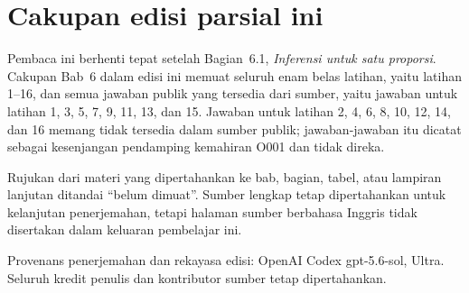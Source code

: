 \documentclass[10pt,openany]%
{book}
\date{}
\begin{document}
%
\renewcommand{\thepage}{}
\maketitle

\renewcommand{\thepage}{\arabic{page}}
\tableofcontents

\normalsize

\chapter*{Cakupan edisi parsial ini}
Pembaca ini berhenti tepat setelah Bagian~6.1,
\emph{Inferensi untuk satu proporsi}. Cakupan Bab~6 dalam edisi ini
memuat seluruh enam belas latihan, yaitu latihan 1--16, dan semua
jawaban publik yang tersedia dari sumber, yaitu jawaban untuk latihan
1, 3, 5, 7, 9, 11, 13, dan 15. Jawaban untuk latihan 2, 4, 6, 8, 10,
12, 14, dan 16 memang tidak tersedia dalam sumber publik;
jawaban-jawaban itu dicatat sebagai kesenjangan pendamping kemahiran
O001 dan tidak direka.

Rujukan dari materi yang dipertahankan ke bab, bagian, tabel, atau lampiran
lanjutan ditandai ``belum dimuat''. Sumber lengkap tetap dipertahankan untuk
kelanjutan penerjemahan, tetapi halaman sumber berbahasa Inggris tidak
disertakan dalam keluaran pembelajar ini.

Provenans penerjemahan dan rekayasa edisi: OpenAI Codex gpt-5.6-sol, Ultra.
Seluruh kredit penulis dan kontributor sumber tetap dipertahankan.

\begingroup
\makeatletter
\def\@currentlabel{belum dimuat}
\label{ch_regr_mult_and_log}
\label{oneSampleMeansWithTDistribution}
\label{ch_regr_simple_linear}
\label{appendix_data}
\label{linRegrForTwoVar}
\label{normalProbabilityTable}
\label{multipleAndLogisticRegression}
\makeatother
\endgroup

\begingroup

%
\setcounter{chapter}{1}
\addtocounter{chapter}{-1}
\normalsize


\setcounter{chapter}{2}
\addtocounter{chapter}{-1}
\normalsize


\setcounter{chapter}{3}
\addtocounter{chapter}{-1}
\normalsize

\setcounter{chapter}{4}
\addtocounter{chapter}{-1}
\normalsize

\setcounter{chapter}{5}
\addtocounter{chapter}{-1}
\normalsize

\setcounter{chapter}{6}
\addtocounter{chapter}{-1}
\normalsize

\endgroup

\begingroup

\appendix{}
\endgroup
\end{document}

